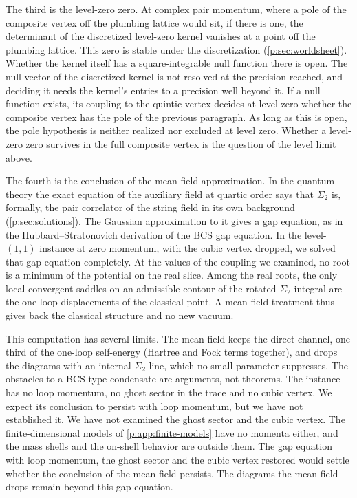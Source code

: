 The third is the level-zero zero.
At complex pair momentum, where a pole of the composite vertex off the plumbing lattice would sit, if there is one, the determinant of the discretized level-zero kernel vanishes at a point off the plumbing lattice.
This zero is stable under the discretization (\cref{p:sec:worldsheet}).
Whether the kernel itself has a square-integrable null function there is open.
The null vector of the discretized kernel is not resolved at the precision reached, and deciding it needs the kernel's entries to a precision well beyond it.
If a null function exists, its coupling to the quintic vertex decides at level zero whether the composite vertex has the pole of the previous paragraph.
As long as this is open, the pole hypothesis is neither realized nor excluded at level zero.
Whether a level-zero zero survives in the full composite vertex is the question of the level limit above.

The fourth is the conclusion of the mean-field approximation.
In the quantum theory the exact equation of the auxiliary field at quartic order says that $\Sigma_2$ is, formally, the pair correlator of the string field in its own background (\cref{p:sec:solutions}).
The Gaussian approximation to it gives a gap equation, as in the Hubbard--Stratonovich derivation of the BCS gap equation.
In the level-$(1, 1)$ instance at zero momentum, with the cubic vertex dropped, we solved that gap equation completely.
At the values of the coupling we examined, no root is a minimum of the potential on the real slice.
  Among the real roots, the only local convergent saddles on an admissible contour of the rotated $\Sigma_2$ integral are the one-loop displacements of the classical point.
A mean-field treatment thus gives back the classical structure and no new vacuum.

This computation has several limits.
  The mean field keeps the direct channel, one third of the one-loop self-energy (Hartree and Fock terms together), and drops the diagrams with an internal $\Sigma_2$ line, which no small parameter suppresses.
The obstacles to a BCS-type condensate are arguments, not theorems.
The instance has no loop momentum, no ghost sector in the trace and no cubic vertex.
We expect its conclusion to persist with loop momentum, but we have not established it.
  We have not examined the ghost sector and the cubic vertex.
The finite-dimensional models of \cref{p:app:finite-models} have no momenta either, and the mass shells and the on-shell behavior are outside them.
The gap equation with loop momentum, the ghost sector and the cubic vertex restored would settle whether the conclusion of the mean field persists.
The diagrams the mean field drops remain beyond this gap equation.

